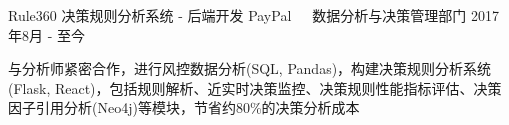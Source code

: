 \documentclass[11pt, a4paper, UTF8]{awesome-cv}
\begin{document}
%
\begin{cventries}
  \cventry
    {Rule360 决策规则分析系统 - 后端开发} %
    {PayPal{\ \cdotp\ \ }数据分析与决策管理部门} %
    {2017年8月 - 至今} %
    {\ } %
    {
      \begin{cvitems} %
        \item {与分析师紧密合作，进行风控数据分析(SQL, Pandas)，构建决策规则分析系统(Flask, React)，包括规则解析、近实时决策监控、决策规则性能指标评估、决策因子引用分析(Neo4j)等模块，节省约80\%的决策分析成本}
      \end{cvitems}
    }
    

\end{cventries}
\end{document}
